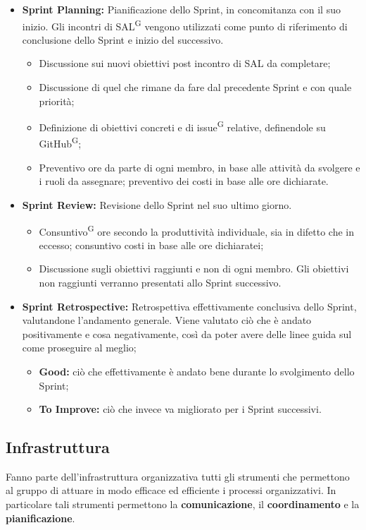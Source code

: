 \documentclass[8pt]{article}
\newcommand{\glossterm}[1]{#1\textsuperscript{G}} %
\begin{document}
\begin{itemize}
  \item \textbf{Sprint Planning:} Pianificazione dello Sprint, in concomitanza con il suo inizio.
      Gli incontri di \glossterm{SAL} vengono utilizzati come punto di riferimento di conclusione
        dello Sprint e inizio del successivo.
  \begin{itemize}
    \item Discussione sui nuovi obiettivi post incontro di SAL da completare;
    \item Discussione di quel che rimane da fare dal precedente Sprint e con quale priorità;
    \item Definizione di obiettivi concreti e di \glossterm{issue} relative, definendole su
        \glossterm{GitHub};
    \item Preventivo ore da parte di ogni membro, in base alle attività da svolgere e i ruoli da assegnare; preventivo dei costi in base alle ore dichiarate.
  \end{itemize}
  \item \textbf{Sprint Review:} Revisione dello Sprint nel suo ultimo giorno.
  \begin{itemize}
    \item \glossterm{Consuntivo} ore secondo la produttività individuale, sia in difetto che in eccesso;
        consuntivo costi in base alle ore dichiaratei;
    \item Discussione sugli obiettivi raggiunti e non di ogni membro. Gli obiettivi non raggiunti verranno presentati allo Sprint successivo.
  \end{itemize}
  \item \textbf{Sprint Retrospective:} Retrospettiva effettivamente conclusiva dello Sprint,
      valutandone l'andamento generale. Viene valutato ciò che è andato positivamente e cosa
        negativamente, così da poter avere delle linee guida sul come proseguire al meglio;
  \begin{itemize}
      \item \textbf{Good:} ciò che effettivamente è andato bene durante lo svolgimento dello Sprint;
      \item \textbf{To Improve:} ciò che invece va migliorato per i Sprint successivi.
  \end{itemize}
\end{itemize} 
\subsection{Infrastruttura}\label{sec:infrastruttura}
Fanno parte dell'infrastruttura organizzativa tutti gli strumenti che permettono al gruppo di attuare in modo efficace ed efficiente i processi organizzativi. In particolare tali strumenti permettono la \textbf{comunicazione}, il \textbf{coordinamento} e la \textbf{pianificazione}.
\end{document}
